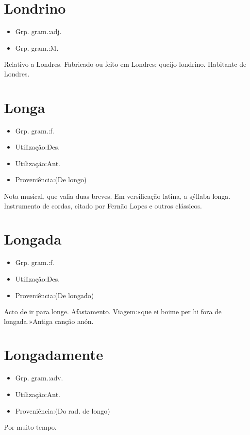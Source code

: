 \section{Londrino}
\begin{itemize}
\item {Grp. gram.:adj.}
\end{itemize}
\begin{itemize}
\item {Grp. gram.:M.}
\end{itemize}
Relativo a Londres.
Fabricado ou feito em Londres: \textunderscore queijo londrino\textunderscore .
Habitante de Londres.
\section{Longa}
\begin{itemize}
\item {Grp. gram.:f.}
\end{itemize}
\begin{itemize}
\item {Utilização:Des.}
\end{itemize}
\begin{itemize}
\item {Utilização:Ant.}
\end{itemize}
\begin{itemize}
\item {Proveniência:(De \textunderscore longo\textunderscore )}
\end{itemize}
Nota musical, que valia duas breves.
Em versificação latina, a sýllaba longa.
Instrumento de cordas, citado por Fernão Lopes e outros clássicos.
\section{Longada}
\begin{itemize}
\item {Grp. gram.:f.}
\end{itemize}
\begin{itemize}
\item {Utilização:Des.}
\end{itemize}
\begin{itemize}
\item {Proveniência:(De \textunderscore longado\textunderscore )}
\end{itemize}
Acto de ir para longe.
Afastamento.
Viagem:«\textunderscore que ei boime per hi fora de longada.\textunderscore »Antiga canção anón.
\section{Longadamente}
\begin{itemize}
\item {Grp. gram.:adv.}
\end{itemize}
\begin{itemize}
\item {Utilização:Ant.}
\end{itemize}
\begin{itemize}
\item {Proveniência:(Do rad. de \textunderscore longo\textunderscore )}
\end{itemize}
Por muito tempo.
